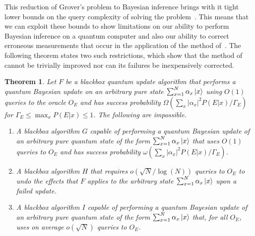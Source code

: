 \documentclass[aps,amsmath,onecolumn,amssymb,notitlepage]{revtex4-1}
\newtheorem{theorem}{Theorem}
\begin{document}
This reduction of Grover's problem to Bayesian inference brings with it tight lower bounds on the query complexity of solving the problem~\cite{BGH+96}.  This means that we can exploit these bounds to show limitations on our ability to perform Bayesian inference on a quantum computer and also our ability to correct erroneous measurements that occur in the application of the method of~.  The following theorem states two such restrictions, which show that the method of~ cannot be trivially improved nor can its failures be inexpensively corrected. 
\begin{theorem}
Let $F$ be a blackbox quantum update algorithm that performs a quantum Bayesian update on an arbitrary pure state $\sum_{x=1}^N \alpha_x \left|x\right\rangle$ using $O(1)$ queries to the oracle $O_E$ and has success probability $\Omega({\sum_x |\alpha_x|^2 P(E|x)/\Gamma_E})$ for $\Gamma_E \le \max_x P(E|x)\le 1$.  The following are impossible.
\begin{enumerate}
\item A blackbox algorithm $G$ capable of performing a quantum Bayesian update of an arbitrary pure quantum state of the form $\sum_{x=1}^N \alpha_x \left|x\right\rangle$ that uses $O(1)$ queries to $O_E$ and has  success probability $\omega({\sum_x |\alpha_x|^2 P(E|x)/\Gamma_E})$.
\item A blackbox algorithm $H$ that requires $o(\sqrt{N}/\log(N))$ queries to $O_E$ to undo the effects that $F$ applies to the arbitrary state $\sum_{x=1}^N \alpha_x \left|x\right\rangle$ upon a failed update.
\item A blackbox algorithm $I$ capable of performing a quantum Bayesian update of an arbitrary pure quantum state of the form $\sum_{x=1}^N \alpha_x \left|x\right\rangle$ that, for all $O_E$, uses on average $o(\sqrt{N})$ queries to $O_E$.
\end{enumerate}
\end{theorem}
\end{document}
